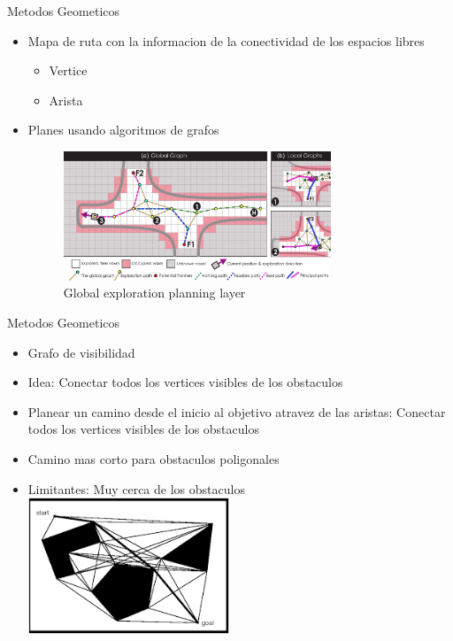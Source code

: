 \documentclass[
	11pt, %
]{beamer}
\begin{document}
\begin{frame}{Metodos Geometicos}
  \begin{itemize}
  \item Mapa de ruta con la informacion de la conectividad de los espacios libres\\
    \begin{itemize}
    \item Vertice
    \item Arista
    \end{itemize}
  \item Planes usando algoritmos de grafos\\
    \bigskip %
    \begin{figure}
      \centering
      \includegraphics[angle=0,width=8cm]{path_graph}
      \caption[Caption for LOF]{Global exploration planning layer\protect\footnotemark}
    \end{figure}
  \end{itemize}
\end{frame}

\begin{frame}{Metodos Geometicos}
  \begin{itemize}
  \item Grafo de visibilidad\\
  \item Idea: Conectar todos los vertices visibles  de los obstaculos\\
  \item Planear un camino desde el inicio al objetivo atravez de las aristas: Conectar todos los vertices visibles  de los obstaculos\\
  \item Camino mas corto para obstaculos poligonales\\
  \item Limitantes: Muy cerca de los obstaculos\\
    \centering
    \bigskip %
    \includegraphics[width=6cm]{visibilidad}
  \end{itemize}
\end{frame}
\end{document}
